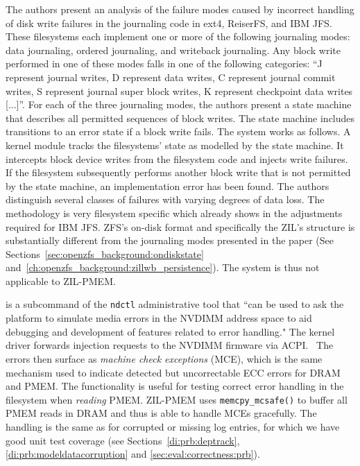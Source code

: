 \documentclass[12pt,a4paper,twoside]{book}
\begin{document}
The authors present an analysis of the failure modes caused by incorrect handling of disk write failures in the journaling code in ext4, ReiserFS, and IBM JFS.
These filesystems each implement one or more of the following journaling modes: data journaling, ordered journaling, and writeback journaling.
Any block write performed in one of these modes falls in one of the following categories:
“J represent journal writes, D represent data writes, C represent journal commit writes, S represent journal super block writes, K represent checkpoint data writes [...]”.
For each of the three journaling modes, the authors present a state machine that describes all permitted sequences of block writes.
The state machine includes transitions to an error state if a block write fails.
The system works as follows.
A kernel module tracks the filesystems' state as modelled by the state machine.
It intercepts block device writes from the filesystem code and injects write failures.
If the filesystem subsequently performs another block write that is not permitted by the state machine, an implementation error has been found.
The authors distinguish several classes of failures with varying degrees of data loss.
The methodology is very filesystem specific which already shows in the adjustments required for IBM JFS.
ZFS's on-disk format and specifically the ZIL's structure is substantially different from the journaling modes presented in the paper (See Sections~\ref{sec:openzfs_background:ondiskstate} and~\ref{ch:openzfs_background:zillwb_persistence}).
The system is thus not applicable to ZIL-PMEM.

 is a subcommand of the \lstinline{ndctl} administrative tool that
``can be used to ask the platform to simulate media errors in the NVDIMM address space to aid debugging and development of features related to error handling."
The kernel driver forwards injection requests to the NVDIMM firmware via ACPI.~\cite{NdctlPATCHV2}
The errors then surface as \textit{machine check exceptions} (MCE), which is the same mechanism used to indicate detected but uncorrectable ECC errors for DRAM and PMEM.
The functionality is useful for testing correct error handling in the filesystem when \textit{reading} PMEM.
ZIL-PMEM uses \lstinline{memcpy_mcsafe()} to buffer all PMEM reads in DRAM and thus is able to handle MCEs gracefully.
The handling is the same as for corrupted or missing log entries, for which we have good unit test coverage (see Sections~\ref{di:prb:deptrack}, \ref{di:prb:modeldatacorruption} and \ref{sec:eval:correctness:prb}).
\end{document}
